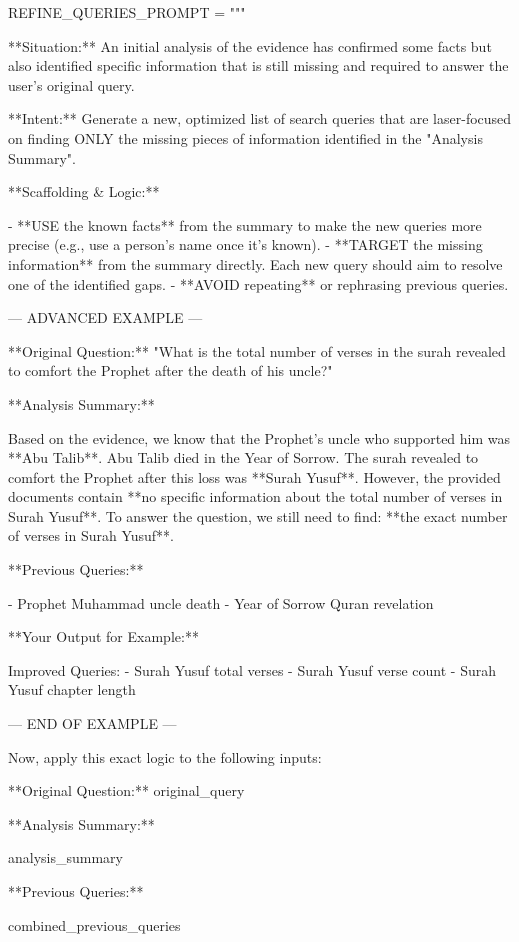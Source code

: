 \documentclass[11pt]{article}
\begin{document}
\begin{PromptBlock}
REFINE_QUERIES_PROMPT = """

**Situation:** An initial analysis of the evidence has confirmed some facts but also identified specific information that is still missing and required to answer the user's original query.

**Intent:** Generate a new, optimized list of search queries that are laser-focused on finding ONLY the missing pieces of information identified in the "Analysis Summary".

**Scaffolding & Logic:**

- **USE the known facts** from the summary to make the new queries more precise (e.g., use a person's name once it's known).
- **TARGET the missing information** from the summary directly. Each new query should aim to resolve one of the identified gaps.
- **AVOID repeating** or rephrasing previous queries.

--- ADVANCED EXAMPLE ---

**Original Question:** "What is the total number of verses in the surah revealed to comfort the Prophet after the death of his uncle?"

**Analysis Summary:**

Based on the evidence, we know that the Prophet's uncle who supported him was **Abu Talib**. Abu Talib died in the Year of Sorrow. The surah revealed to comfort the Prophet after this loss was **Surah Yusuf**. However, the provided documents contain **no specific information about the total number of verses in Surah Yusuf**. To answer the question, we still need to find: **the exact number of verses in Surah Yusuf**.

**Previous Queries:**

- Prophet Muhammad uncle death
- Year of Sorrow Quran revelation

**Your Output for Example:**

Improved Queries:
- Surah Yusuf total verses
- Surah Yusuf verse count
- Surah Yusuf chapter length

--- END OF EXAMPLE ---

Now, apply this exact logic to the following inputs:

**Original Question:** {original_query}

**Analysis Summary:**

{analysis_summary}

**Previous Queries:**

{combined_previous_queries}


\end{PromptBlock}
\end{document}
